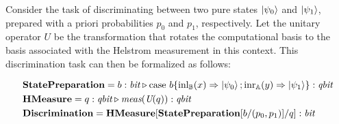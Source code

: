 \documentclass[10pt,a4paper]{amsart}
\theoremstyle{definition}
\theoremstyle{definition}
\theoremstyle{definition}
\theoremstyle{definition}
\theoremstyle{definition}
\theoremstyle{definition}
\begin{document}
Consider the task of discriminating between two pure states $\ket{\psi_0}$ and $\ket{\psi_1}$, prepared with a priori probabilities $p_0$ and $p_1$, respectively. Let the unitary operator $U$  be the transformation that rotates the computational basis to the basis associated with the Helstrom measurement  in this context. This discrimination task can then be formalized as follows:

\begin{align*}
  &\textbf{StatePreparation} =  b:\textit{bit}  \triangleright  \text{case } b \{\text{inl}_{\mathbb{B}}(x) \Rightarrow \ket{\psi_0} ; \text{inr}_{\mathbb{A}}(y) \Rightarrow \ket{\psi_1}\}: \textit{qbit} \\
  &\textbf{HMeasure} =  q: \textit{qbit} \triangleright \textit{meas} (\textit{U}(q))  : \textit{qbit} \\
  &\textbf{Discrimination} =  \textbf{HMeasure} [ \textbf{StatePreparation} [b/(p_0,p_1)] / q] : \textit{bit}
\end{align*}

 

\end{document}
